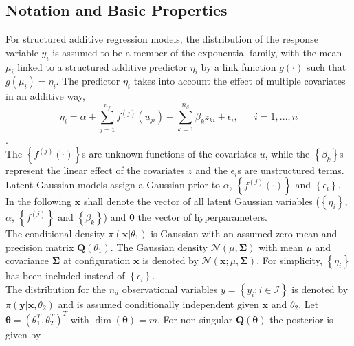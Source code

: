 \subsection{Notation and Basic Properties}
\label{sec:notation}
For structured additive regression models, the distribution of the response variable $y_i$ is assumed to be a member of the exponential family, with the mean $\mu_i$ linked to a structured additive predictor $\eta_i$ by a link function $g\left(\cdot\right)$ such that $g\left(\mu_i\right)=\eta_i$. The predictor $\eta_i$  takes into account the effect of multiple covariates in an additive way,
\begin{equation}\label{eq:predictor}
    \eta_i=\alpha+\sum_{j=1}^{n_f}f^{(j)}\left(u_{ji}\right)+\sum_{k=1}^{n_{\beta}}\beta_kz_{ki}+\epsilon_i, \hspace{20pt}i=1,...,n
\end{equation}
\autocite[][]{stone1985additive}.\\
The $\left\lbrace f^{(j)}\left(\cdot\right)\right\rbrace$s are unknown functions of the covariates $u$, while the $\left\lbrace\beta_k\right\rbrace$s represent the linear effect of the covariates $z$ and the $\epsilon_i$s are unstructured terms. Latent Gaussian models assign a Gaussian prior to $\alpha$, $\left\lbrace f^{(j)}\left(\cdot\right)\right\rbrace$ and $\left\lbrace\epsilon_i\right\rbrace$. In the following $\pmb{x}$ shall denote the vector of all latent Gaussian variables ($\left\lbrace\eta_i\right\rbrace$, $\alpha$, $\left\lbrace f^{(j)}\right\rbrace$ and $\left\lbrace\beta_k\right\rbrace$) and $\pmb{\theta}$ the vector of hyperparameters.\\
The conditional density $\pi\left(\pmb{x}|\theta_1\right)$ is Gaussian with an assumed zero mean and precision matrix $\pmb{Q}\left(\theta_1\right)$. The Gaussian density $\mathcal{N}\left(\mu,\pmb{\Sigma}\right)$ with mean $\mu$ and covariance $\pmb{\Sigma}$ at configuration $\pmb{x}$ is denoted by $\mathcal{N}\left(\pmb{x};\mu,\pmb{\Sigma}\right)$. For simplicity, $\left\lbrace\eta_i\right\rbrace$ has been included instead of $\left\lbrace\epsilon_i\right\rbrace$. \\
The distribution for the $n_d$ observational variables $y=\left\lbrace y_i:i\in\mathcal{I}\right\rbrace$ is denoted by $\pi\left(\pmb{y}|\pmb{x}, \theta_2\right)$ and is assumed conditionally independent given $\pmb{x}$ and $\theta_2$. Let $\pmb{\theta}=\left(\theta_1^T,\theta_2^T\right)^T$ with $\dim\left(\pmb{\theta}\right)=m$. For non-singular $\pmb{Q}\left(\pmb{\theta}\right)$ the posterior is given by
